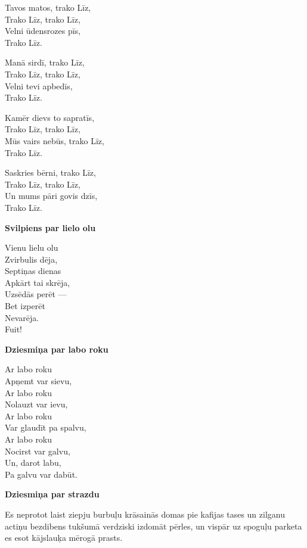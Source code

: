 \documentclass[14pt]{extarticle}
\begin{document}
Tavos matos, trako Līz,\\
Trako Līz, trako Līz,\\
Velni ūdensrozes pīs,\\
Trako Līz.

Manā sirdī, trako Līz,\\
Trako Līz, trako Līz,\\
Velni tevi apbedīs,\\
Trako Līz.

Kamēr dievs to sapratīs,\\
Trako Līz, trako Līz,\\
Mūs vairs nebūs, trako Līz,\\
Trako Līz.

Saskries bērni, trako Līz,\\
Trako Līz, trako Līz,\\
Un mums pāri govis dzīs,\\
Trako Līz.



\newpage

{\bf Svilpiens par lielo olu}

Vienu lielu olu\\
Zvirbulis dēja,\\
Septiņas dienas\\
Apkārt tai skrēja,\\
Uzsēdās perēt ---\\
Bet izperēt\\
Nevarēja.\\
Fuit!



\newpage

{\bf Dziesmiņa par labo roku}

Ar labo roku\\
Apņemt var sievu,\\
Ar labo roku\\
Nolauzt var ievu,\\
Ar labo roku\\
Var glaudīt pa spalvu,\\
Ar labo roku\\
Nocirst var galvu,\\
Un, darot labu,\\
Pa galvu var dabūt.



\newpage

{\bf Dziesmiņa par strazdu}

Es neprotot laist ziepju burbuļu krāsainās domas pie
kafijas tases un zilganu actiņu bezdibens tukšumā
verdziski izdomāt pērles, un vispār uz spoguļu parketa
es esot kājslauķa mērogā prasts. 
\end{document}
